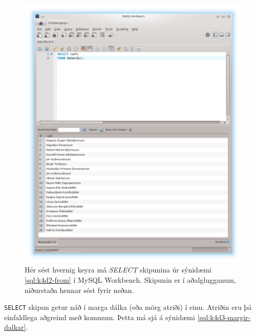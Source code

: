 \begin{figure}
\caption[Niðurstöður SELECT í Workbench]{Hér sést hvernig keyra má \emph{SELECT} skipunina úr sýnidæmi \ref{sql:k4d2-from} í MySQL Workbench. Skipunin er í aðalglugganum, niðurstaða hennar sést fyrir neðan.}
\label{mynd:workbench-select}
\centering
\includegraphics[width=\linewidth]{myndir/workbench-select}
\end{figure}

\verb|SELECT| skipun getur náð í marga dálka (eða mörg atriði) í einu. Atriðin eru þá einfaldlega aðgreind með kommum. Þetta má sjá á sýnidæmi \ref{sql:k4d3-margir-dalkar}.

\begin{example}
\caption[SELECT með mörgum dálkum]{\emph{SELECT} skipun sem nær í marga dálka. }
\label{sql:k4d3-margir-dalkar}
\centering
{}
\end{example}

